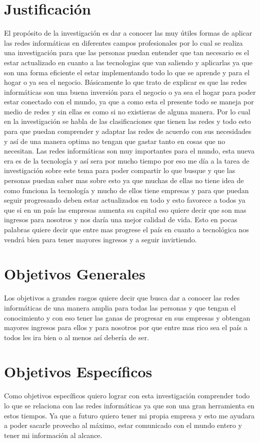 \documentclass{bmcart}
\begin{document}
\section*{Justificación}
El propósito de la investigación es dar a conocer las muy útiles formas de aplicar las redes informáticas en diferentes campos profesionales por lo cual se realiza una investigación para que las personas puedan entender que tan necesario es el estar actualizado en cuanto a las tecnologias que van saliendo y aplicarlas ya que son una forma eficiente el estar implementando todo lo que se aprende y para el hogar o ya sea el negocio.
Básicamente lo que trato de explicar es que las redes informáticas son una buena inversión para el negocio o ya sea el hogar para poder estar conectado con el mundo, ya que a como esta el presente todo se maneja por medio de redes y sin ellas es como si no existieras de alguna manera.
Por lo cual en la investigación se habla de las clasificaciones que tienen las redes y todo esto para que puedan comprender y adaptar las redes de acuerdo con sus necesidades y así de una manera optima no tengan que gastar tanto en cosas que no necesitan.
Las redes informáticas son muy importantes para el mundo, esta nueva era es de la tecnología y así sera por mucho tiempo por eso me día a la tarea de investigación sobre este tema para poder compartir lo que busque y que las personas puedan saber mas sobre esto ya que muchas de ellas no tiene idea de como funciona la tecnología y mucho de ellos tiene empresas y para que puedan seguir progresando deben estar actualizados en todo y esto favorece a todos ya que si en un país las empresas aumenta su capital eso quiere decir que son mas ingresos para nosotros y nos daría una mejor calidad de vida. Esto en pocas palabras quiere decir que entre mas progrese el país en cuanto a tecnológica nos vendrá bien para tener mayores ingresos y a seguir invirtiendo.
\section*{Objetivos Generales}
Los objetivos a grandes rasgos quiere decir que busca dar a conocer las redes informáticas de una manera amplia para todas las personas y que tengan el conocimiento y con eso tener las ganas de progresar en sus empresas y obtengan mayores ingresos para ellos y para nosotros por que entre mas rico sea el país a todos les ira bien o al menos así debería de ser.
\section*{Objetivos Específicos}
Como objetivos específicos quiero lograr con esta investigación comprender todo lo que se relaciona con las redes informáticas ya que son una gran herramienta en estos tiempos.
Ya que a futuro quiero tener mi propia empresa y esto me ayudara a poder sacarle provecho al máximo, estar comunicado con el mundo entero y tener mi información al alcance. 
\end{document}
